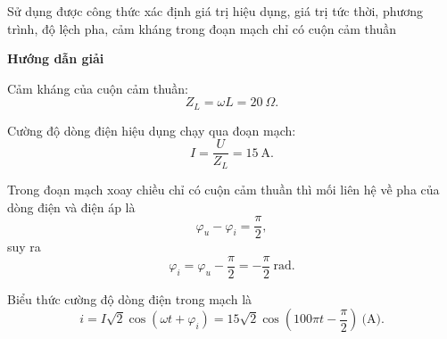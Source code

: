 \begin{dang}{ Sử dụng được công thức xác định giá trị hiệu dụng, giá trị tức thời, phương trình, độ lệch pha, cảm kháng trong đoạn mạch chỉ có cuộn cảm thuần}
	
	{\begin{center}
			\textbf{Hướng dẫn giải}
		\end{center}
		
		Cảm kháng của cuộn cảm thuần:
		\begin{equation*}
			Z_L = \omega L  = \SI{20}{\Omega}.
		\end{equation*}
		
		Cường độ dòng điện hiệu dụng chạy qua đoạn mạch:
		\begin{equation*}
			I=\dfrac{U}{Z_L}=\SI{15}{\ampere}.
		\end{equation*}
		
		Trong đoạn mạch xoay chiều chỉ có cuộn cảm thuần thì mối liên hệ về pha của dòng điện và điện áp là
		\begin{equation*}
			\varphi_u - \varphi_i = \dfrac{\pi}{2},
		\end{equation*}
		suy ra
		\begin{equation*}
			\varphi_i = \varphi_u-\dfrac{\pi}{2} = -\dfrac{\pi}{2}\ \text {rad}.
		\end{equation*}	
		
		Biểu thức cường độ dòng điện trong mạch là
		\begin{equation*}
			i=I\sqrt 2 \cos (\omega t + \varphi_i) = 15\sqrt 2 \cos \left(100 \pi t -\dfrac{\pi}{2} \right) \ \text{(A)}.
		\end{equation*}
		
}
\end{dang}
